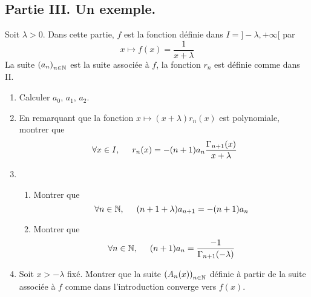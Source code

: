 \subsection*{Partie III. Un exemple.}
Soit $\lambda >0$. Dans cette partie, $f$ est la fonction définie dans $I = ]-\lambda, +\infty[$ par
\begin{displaymath}
 x\mapsto f(x) = \frac{1}{x+\lambda}
\end{displaymath}
La suite $\left( a_n\right) _{n\in \mathbb{N}}$ est la suite associée à $f$, la fonction $r_n$ est définie comme dans II.
\begin{enumerate}
 \item Calculer $a_0$, $a_1$, $a_2$.
 \item En remarquant que la fonction $x\mapsto (x+\lambda)r_n(x)$ est polynomiale, montrer que 
\begin{displaymath}
 \forall x\in I,\hspace{0.5cm} r_n(x) = -(n+1)a_n\frac{\Gamma_{n+1}(x)}{x+\lambda}
\end{displaymath}
\item
\begin{enumerate}
 \item Montrer que 
\begin{displaymath}
 \forall n \in \mathbb{N},\hspace{0.5cm} (n+1+\lambda)a_{n+1} = -(n+1)a_n
\end{displaymath}
\item Montrer que 
\begin{displaymath}
 \forall n \in \mathbb{N},\hspace{0.5cm} (n+1)a_{n} = \frac{-1}{\Gamma_{n+1}(-\lambda)}
\end{displaymath}
\end{enumerate}
\item Soit $x> -\lambda$ fixé. Montrer que la suite $\left( A_n(x)\right)_{n\in \mathbb{N}}$ définie à partir de la suite associée à $f$ comme dans l'introduction converge vers $f(x)$.
\end{enumerate}


